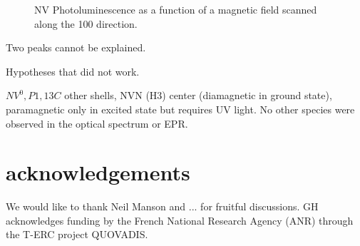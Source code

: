 \documentclass[preprintnumbers,amsmath,amssymb,twocolumn]{revtex4-1}
\begin{document}
\begin{figure}[!ht]
  \centering {}
  \caption{NV Photoluminescence as a function of a magnetic field scanned along the 100 direction. 
 }
\end{figure}

Two peaks cannot be explained. 

Hypotheses that did not work.


$NV^0, P1, 13C$ other shells, NVN (H3) center (diamagnetic in ground state), paramagnetic only in excited state but requires UV light. 
No other species were observed in the optical spectrum or EPR. 












\section*{acknowledgements}
We would like to thank Neil Manson and ... for fruitful discussions. 
GH acknowledges funding by the French National Research Agency (ANR) through the T-ERC project QUOVADIS. 


\end{document}
